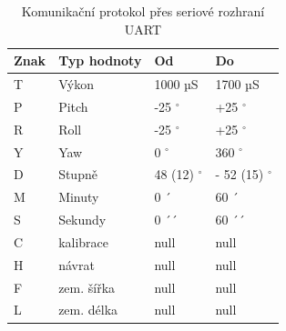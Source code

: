 \begin{table}[H]
	\centering
	\begin{tabular}{|l|l|l|l|}
		\hline
		\textbf{Znak} & \textbf{Typ hodnoty} & \textbf{Od} & \textbf{Do} \\ \hline
		T             & Výkon                & 1000 µS     & 1700 µS     \\ \hline
		P             & Pitch                & -25 $^\circ$        & +25 $^\circ$        \\ \hline
		R             & Roll                 & -25 $^\circ$        & +25 $^\circ$        \\ \hline
		Y             & Yaw                  & 0 $^\circ$          & 360 $^\circ$        \\ \hline
		D             & Stupně               & 48 (12) $^\circ$    & - 52 (15) $^\circ$  \\ \hline
		M             & Minuty               & 0 ´           & 60 ´         \\ \hline
		S             & Sekundy              & 0 ´´          & 60 ´´         \\ \hline
		C             & kalibrace            & null        & null        \\ \hline
		H             & návrat               & null        & null        \\ \hline
		F             & zem. šířka           & null        & null        \\ \hline
		L             & zem. délka           & null        & null        \\ \hline
	\end{tabular}
\caption{Komunikační protokol přes seriové rozhraní UART}
\end{table}


